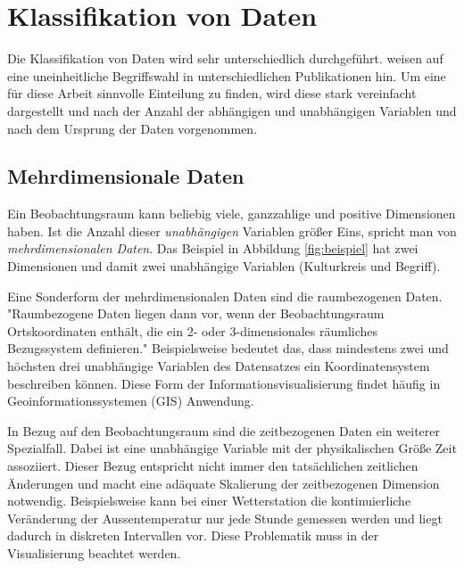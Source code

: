 \documentclass[a4paper, 12pt, DIVcalc, onepage, pdftex, headsepline, footsepline]{scrreprt}
\begin{document}
\section{Klassifikation von Daten}
\label{sec:KlassifikationDaten}

Die Klassifikation von Daten wird sehr unterschiedlich durchgeführt.
\citep{Schumann} weisen auf eine uneinheitliche Begriffswahl in unterschiedlichen
Publikationen hin.
Um eine für diese Arbeit sinnvolle Einteilung zu finden, wird diese stark vereinfacht dargestellt und nach der Anzahl der abhängigen und
unabhängigen Variablen und nach dem Ursprung der Daten vorgenommen.

\subsection{Mehrdimensionale Daten}
Ein Beobachtungsraum kann beliebig viele, ganzzahlige und positive Dimensionen haben. Ist die Anzahl
dieser \textit{unabhängigen} Variablen größer Eins, spricht man von \textit{mehrdimensionalen Daten}. Das Beispiel
in Abbildung \ref{fig:beispiel} hat zwei Dimensionen und damit zwei unabhängige
Variablen (Kulturkreis und Begriff).

Eine Sonderform der mehrdimensionalen Daten sind die raumbezogenen Daten.
"Raumbezogene Daten liegen dann vor, wenn der Beobachtungsraum Ortskoordinaten enthält,
die ein 2- oder 3-dimensionales räumliches Bezugssystem definieren."\citep[S.\,220]{Schumann}
Beispielsweise bedeutet das, dass mindestens zwei und höchsten drei unabhängige Variablen des Datensatzes
ein Koordinatensystem beschreiben können. Diese Form der Informationsvisualisierung findet häufig
in Geoinformationssystemen (GIS) Anwendung.

In Bezug auf den Beobachtungsraum sind die zeitbezogenen Daten ein weiterer Spezialfall.
Dabei ist eine unabhängige Variable mit der physikalischen Größe Zeit assoziiert.
Dieser Bezug entspricht nicht immer den tatsächlichen zeitlichen Änderungen und macht
eine adäquate Skalierung der zeitbezogenen Dimension notwendig.
Beispielsweise kann bei einer Wetterstation die kontinuierliche Veränderung der Aussentemperatur
nur jede Stunde gemessen werden und liegt dadurch in diskreten Intervallen vor.
Diese Problematik muss in der Visualisierung beachtet werden.
\end{document}

